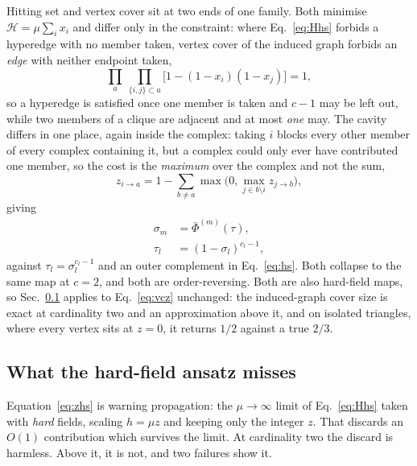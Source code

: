 \documentclass[aps,pre,twocolumn,superscriptaddress,floatfix]{revtex4-2}
\begin{document}
Hitting set and vertex cover sit at two ends of one family. Both minimise
$\mathcal{H}=\mu\sum_i x_i$ and differ only in the constraint: where
Eq.~\eqref{eq:Hhs} forbids a hyperedge with no member taken, vertex cover of the
induced graph forbids an \emph{edge} with neither endpoint taken,
\begin{equation}
  \prod_{a}\ \prod_{\{i,j\}\subset a}\Big[1-(1-x_i)(1-x_j)\Big]=1,
  \label{eq:Hvc}
\end{equation}
so a hyperedge is satisfied once one member is taken and $c-1$ may be left out,
while two members of a clique are adjacent and at most \emph{one} may. The cavity differs in one place,
again inside the complex: taking $i$ blocks every other member of every complex
containing it, but a complex could only ever have contributed one member, so the
cost is the \emph{maximum} over the complex and not the sum,
\begin{equation}
  z_{i\to a}=1-\sum_{b\neq a}\max\Big(0,\max_{j\in b\setminus i}z_{j\to b}\Big),
  \label{eq:vcz}
\end{equation}
giving
\begin{equation}
  \begin{split}
    \sigma_m&=\bar\Phi^{(m)}(\tau),\\
    \tau_l&=(1-\sigma_l)^{c_l-1},
  \end{split}
  \label{eq:vc}
\end{equation}
against $\tau_l=\sigma_l^{c_l-1}$ and an outer complement in Eq.~\eqref{eq:hs}.
Both collapse to the same map at $c=2$, and both are order-reversing. Both are
also hard-field maps, so Sec.~\ref{sec:hardfield} applies to
Eq.~\eqref{eq:vcz} unchanged: the induced-graph cover size is exact at
cardinality two and an approximation above it, and on isolated triangles, where
every vertex sits at $z=0$, it returns $1/2$ against a true $2/3$.

\subsection{What the hard-field ansatz misses}
\label{sec:hardfield}

Equation~\eqref{eq:zhs} is warning propagation: the $\mu\to\infty$ limit of
Eq.~\eqref{eq:Hhs} taken with \emph{hard} fields, scaling $h=\mu z$ and keeping
only the integer $z$.
That discards an $O(1)$ contribution which survives the limit. At cardinality
two the discard is harmless. Above it, it is not, and two failures show it.
\end{document}
